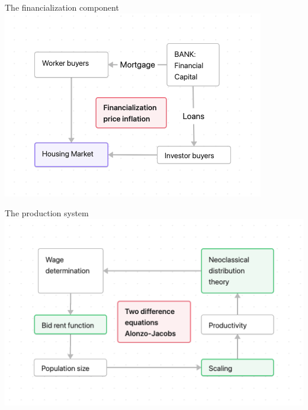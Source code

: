 \documentclass{beamer}
\begin{document}
\begin{frame}{The financialization component}
\centering
\includegraphics[scale=.55]{fig/flow-financialization.png}
\end{frame}

\begin{frame}{The production system}
\centering
\includegraphics[scale=.55]{fig/flow-alonso-jacobs-cycle.png}
\end{frame}
\end{document}
